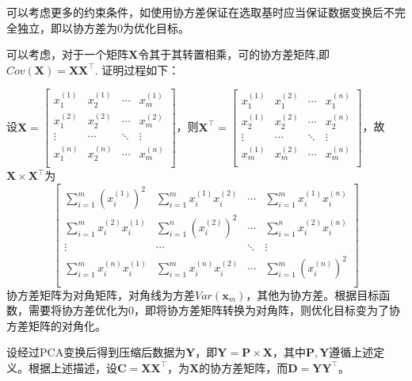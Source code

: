 \documentclass[12pt,a4paper]{article}
\begin{document}
  可以考虑更多的约束条件，如使用协方差保证在选取基时应当保证数据变换后不完全独立，即以协方差为0为优化目标。

  可以考虑，对于一个矩阵$\mathbf{X}$令其于其转置相乘，可的协方差矩阵,即$Cov(\mathbf{X}) = \mathbf{X} \mathbf{X}^\top$. 证明过程如下：

  设$\mathbf{X} = \left[\begin{array}{cccc}
    x^{(1)}_1 & x^{(1)}_2 & \cdots & x^{(1)}_m \\ 
    x^{(2)}_1 & x^{(2)}_2 & \cdots & x^{(2)}_m \\ 
    \vdots & \cdots & \ddots & \vdots \\ 
    x^{(n)}_1 & x^{(n)}_2 & \cdots & x^{(n)}_m \\ 
  \end{array}\right]$，则$\mathbf{X}^\top=\left[\begin{array}{cccc}
    x^{(1)}_1 & x^{(2)}_1 & \cdots & x^{(n)}_1 \\ 
    x^{(1)}_2 & x^{(2)}_2 & \cdots & x^{(n)}_2 \\ 
    \vdots & \cdots & \ddots & \vdots \\ 
    x^{(1)}_m & x^{(2)}_m & \cdots & x^{(n)}_m \\ 
  \end{array}\right]$，故$\mathbf{X} \times \mathbf{X}^\top$为
  $$
  \left[\begin{array}{cccc}
    \sum\limits_{i=1}^{m} \left(x_i^{(1)}\right)^2 & \sum\limits_{i=1}^{m} x_i^{(1)}x_i^{(2)} & \cdots &\sum\limits_{i=1}^{m} x_i^{(1)}x_i^{(n)} \\ 
    \sum\limits_{i=1}^{m} x_i^{(2)}x_i^{(1)} & \sum\limits_{i=1}^{n} \left(x_i^{(2)}\right)^2 & \cdots &\sum\limits_{i=1}^{n} x_i^{(2)}x_i^{(n)} \\ 
    \vdots & \cdots & \ddots & \vdots \\ 
    \sum\limits_{i=1}^{m} x_i^{(n)}x_i^{(1)} & \sum\limits_{i=1}^{m} x_i^{(n)}x_i^{(2)} & \cdots &\sum\limits_{i=1}^{m} \left(x_i^{(n)}\right)^2 \\ 
  \end{array}\right]
  $$
  协方差矩阵为对角矩阵，对角线为方差$Var(\mathbf{x}_m)$，其他为协方差。根据目标函数，需要将协方差优化为0，即将协方差矩阵转换为对角阵，则优化目标变为了协方差矩阵的对角化。

  设经过PCA变换后得到压缩后数据为$\mathbf{Y}$，即$\mathbf{Y}=\mathbf{P}\times \mathbf{X}$，其中$\mathbf{P},\mathbf{Y}$遵循上述定义。根据上述描述，设$\mathbf{C} = \mathbf{X} \mathbf{X}^\top$，为$\mathbf{X}$的协方差矩阵，而$\mathbf{D}=\mathbf{Y} \mathbf{Y}^\top$。
\end{document}
